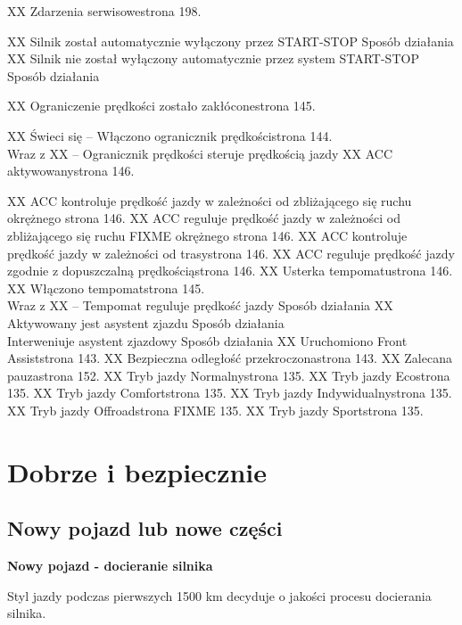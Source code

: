XX	Zdarzenia serwisowe\guillemotright strona 198.

XX	Silnik został automatycznie wyłączony przez START-STOP \guillemotright Sposób działania
XX	Silnik nie został wyłączony automatycznie przez system START-STOP \guillemotright Sposób działania

XX	Ograniczenie prędkości zostało zakłócone\guillemotright strona 145.

XX	Świeci się -- Włączono ogranicznik prędkości\guillemotright strona 144. \\ Wraz z XX -- Ogranicznik prędkości steruje prędkością jazdy
XX	ACC aktywowany\guillemotright strona 146.

XX	ACC kontroluje prędkość jazdy w zależności od zbliżającego się ruchu okrężnego \guillemotright strona 146.
XX	ACC reguluje prędkość jazdy w zależności od zbliżającego się ruchu FIXME okrężnego \guillemotright strona 146.
XX	ACC kontroluje prędkość jazdy w zależności od trasy\guillemotright strona 146.
XX	ACC reguluje prędkość jazdy zgodnie z dopuszczalną prędkością\guillemotright strona 146.
XX	Usterka tempomatu\guillemotright strona 146.
XX	Włączono tempomat\guillemotright strona 145. \\ Wraz z XX -- Tempomat reguluje prędkość jazdy \guillemotright Sposób działania
XX	Aktywowany jest asystent zjazdu \guillemotright Sposób działania \\ Interweniuje asystent zjazdowy \guillemotright Sposób działania
XX	Uruchomiono Front Assist\guillemotright strona 143.
XX	Bezpieczna odległość przekroczona\guillemotright strona 143.
XX	Zalecana pauza\guillemotright strona 152.
XX	Tryb jazdy Normalny\guillemotright strona 135.
XX	Tryb jazdy Eco\guillemotright strona 135.
XX	Tryb jazdy Comfort\guillemotright strona 135.
XX	Tryb jazdy Indywidualny\guillemotright strona 135.
XX	Tryb jazdy Offroad\guillemotright strona FIXME 135.
XX	Tryb jazdy Sport\guillemotright strona 135.

\section{Dobrze i bezpiecznie}

\subsection{Nowy pojazd lub nowe części}

\textbf{Nowy pojazd - docieranie silnika}

Styl jazdy podczas pierwszych 1500 km decyduje o jakości procesu docierania silnika.

